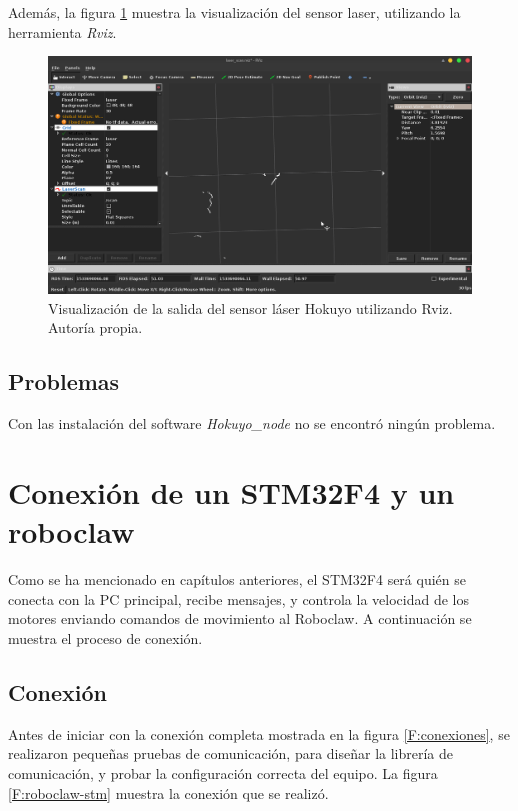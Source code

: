 Además, la figura \ref{F:hokuyorviz} muestra la visualización del sensor laser, utilizando la herramienta \textit{Rviz}.

\begin{figure}[h!]
\centering
\includegraphics[scale=0.34]{imagenes/hokuyorviz.png}
\caption{Visualización de la salida del sensor láser Hokuyo utilizando Rviz. Autoría propia. }
\label{F:hokuyorviz}
\end{figure}

\subsection{Problemas}

Con las instalación del software \textit{Hokuyo\_node} no se encontró ningún problema.

\section{Conexión de un STM32F4 y un roboclaw}

Como se ha mencionado en capítulos anteriores, el STM32F4 será quién se conecta con la PC principal, recibe mensajes, y controla la velocidad de los motores enviando comandos de movimiento al Roboclaw. A continuación se muestra el proceso de conexión.

\subsection{Conexión}

Antes de iniciar con la conexión completa mostrada en la figura \ref{F:conexiones}, se realizaron pequeñas pruebas de comunicación, para diseñar la librería de comunicación, y probar la configuración correcta del equipo. La figura \ref{F:roboclaw-stm} muestra la conexión que se realizó.

